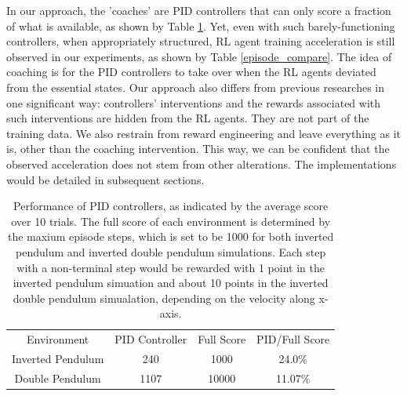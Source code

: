 \documentclass[journal]{IEEEtran}
\begin{document}
In our approach, the 'coaches' are PID controllers that can only score a fraction of what is available, as shown by Table \ref{score_compare}. Yet, even with such barely-functioning controllers, when appropriately structured, RL agent training acceleration is still observed in our experiments, as shown by Table \ref{episode_compare}. The idea of coaching is for the PID controllers to take over when the RL agents deviated from the essential states. Our approach also differs from previous researches in one significant way: controllers' interventions and the rewards associated with such interventions are hidden from the RL agents. They are not part of the training data. We also restrain from reward engineering and leave everything as it is, other than the coaching intervention. This way, we can be confident that the observed acceleration does not stem from other alterations. The implementations would be detailed in subsequent sections.


\begin{table}
\footnotesize
\caption{Performance of PID controllers, as indicated by the average score over 10 trials. The full score of each environment is determined by the maxium episode steps, which is set to be 1000 for both inverted pendulum and inverted double pendulum simulations. Each step with a non-terminal step would be rewarded with 1 point in the inverted pendulum simuation and about 10 points in the inverted double pendulum simualation, depending on the velocity along x-axis.}
\label{score_compare}
\centering
\begin{tabular}{ cccc }
\rowcolor{airforceblue}
Environment &   PID Controller &Full Score &PID\slash Full Score \\
Inverted Pendulum &  240 & 1000&  24.0\%\\
\rowcolor{beaublue}

Double Pendulum &  1107 & 10000& 11.07\%\\
\end{tabular}
\end{table}
\end{document}
